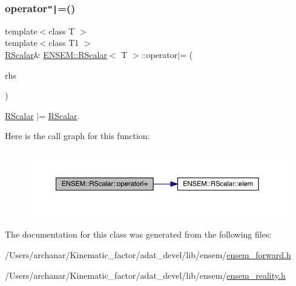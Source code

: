 \subsubsection{\texorpdfstring{operator\texttt{"|}=()}{operator|=()}\hspace{0.1cm}{\footnotesize\ttfamily [2/2]}}
{\footnotesize\ttfamily template$<$class T $>$ \\
template$<$class T1 $>$ \\
\mbox{\hyperlink{classENSEM_1_1RScalar}{R\+Scalar}}\& \mbox{\hyperlink{classENSEM_1_1RScalar}{E\+N\+S\+E\+M\+::\+R\+Scalar}}$<$ T $>$\+::operator$\vert$= (\begin{DoxyParamCaption}\item[{const \mbox{\hyperlink{classENSEM_1_1RScalar}{R\+Scalar}}$<$ T1 $>$ \&}]{rhs }\end{DoxyParamCaption})\hspace{0.3cm}{\ttfamily [inline]}}



\mbox{\hyperlink{classENSEM_1_1RScalar}{R\+Scalar}} $\vert$= \mbox{\hyperlink{classENSEM_1_1RScalar}{R\+Scalar}}. 

Here is the call graph for this function\+:
\nopagebreak
\begin{figure}[H]
\begin{center}
\leavevmode
\includegraphics[width=350pt]{d0/d8c/classENSEM_1_1RScalar_ad5838d1c3d7169f6cc7f9b78fe42ac59_cgraph}
\end{center}
\end{figure}


The documentation for this class was generated from the following files\+:\begin{DoxyCompactItemize}
\item 
/\+Users/archanar/\+Kinematic\+\_\+factor/adat\+\_\+devel/lib/ensem/\mbox{\hyperlink{lib_2ensem_2ensem__forward_8h}{ensem\+\_\+forward.\+h}}\item 
/\+Users/archanar/\+Kinematic\+\_\+factor/adat\+\_\+devel/lib/ensem/\mbox{\hyperlink{lib_2ensem_2ensem__reality_8h}{ensem\+\_\+reality.\+h}}\end{DoxyCompactItemize}
